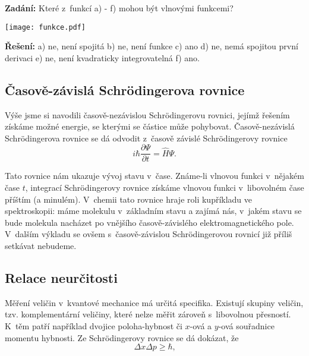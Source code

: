 \begin{priklad}
\textbf{Zadání:} Které z~funkcí a) - f) mohou být vlnovými funkcemi?

\begin{center}
\texttt{[image: funkce.pdf]}

\end{center}

\textbf{Řešení:} a) ne, není spojitá b) ne, není funkce c) ano d) ne, nemá spojitou první derivaci e) ne, není kvadraticky integrovatelná f) ano.
\end{priklad}

\subsection{Časově-závislá Schr\"odingerova rovnice}
Výše jsme si navodili časově-nezávislou Schr\"odingerovu rovnici, jejímž řešením získáme možné energie, se kterými se částice může pohybovat. Časově-nezávislá Schr\"odingerova rovnice se dá odvodit z~časově závislé Schr\"odingerovy rovnice
\begin{equation}
\boxed{i\hbar \frac{\partial\Psi}{\partial t} = \hat{H}\Psi \mbox{.}}
\label{rov:Casovachr1}
\end{equation}

\noindent Tato rovnice nám ukazuje vývoj stavu v~čase. Známe-li vlnovou funkci v~nějakém čase $t$, integrací Schr\"odingerovy rovnice získáme vlnovou funkci v~libovolném čase příštím (a minulém). V~chemii tato rovnice hraje roli kupříkladu ve spektroskopii: máme molekulu v~základním stavu a zajímá nás, v~jakém stavu se bude molekula nacházet po  vnějšího časově-závislého elektromagnetického pole. V~dalším výkladu se ovšem s~časově-závislou Schr\"odingerovou rovnicí již příliš setkávat nebudeme. 

\subsection{Relace neurčitosti}

Měření veličin v~kvantové mechanice má určitá specifika. Existují skupiny veličin, tzv. komplementární veličiny, které nelze měřit zároveň s~libovolnou přesností. K~těm patří například dvojice poloha-hybnost či $x$-ová a $y$-ová souřadnice momentu hybnosti. Ze Schr\"odingerovy rovnice se dá dokázat, že
\begin{equation}
\boxed{\Delta x \Delta p \geq \hbar\mbox{,}}
\label{rov:Neurcitost1}
\end{equation}

